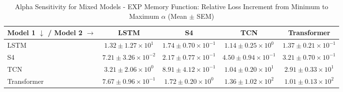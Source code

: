 
\begin{table}[h]
\centering
\caption{Alpha Sensitivity for Mixed Models - EXP Memory Function: Relative Loss Increment from Minimum to Maximum $\alpha$ (Mean $\pm$ SEM)}
\label{tab:mixed_alpha_sensitivity_exp}
\begin{tabular}{lcccc}
\hline
Model 1 $\downarrow$ / Model 2 $\rightarrow$ & LSTM & S4 & TCN & Transformer \\
\hline
LSTM & $1.32 \pm 1.27 \times 10^{1}$ & $1.74 \pm 0.70 \times 10^{-1}$ & $1.14 \pm 0.25 \times 10^{0}$ & $1.37 \pm 0.21 \times 10^{-1}$ \\
S4 & $7.21 \pm 3.26 \times 10^{-2}$ & $2.17 \pm 0.77 \times 10^{-1}$ & $4.50 \pm 0.94 \times 10^{-1}$ & $3.21 \pm 0.70 \times 10^{-1}$ \\
TCN & $3.21 \pm 2.06 \times 10^{0}$ & $8.91 \pm 4.12 \times 10^{-1}$ & $1.04 \pm 0.20 \times 10^{1}$ & $2.91 \pm 0.33 \times 10^{1}$ \\
Transformer & $7.67 \pm 0.96 \times 10^{-1}$ & $1.72 \pm 0.20 \times 10^{0}$ & $1.36 \pm 1.02 \times 10^{2}$ & $1.01 \pm 0.13 \times 10^{2}$ \\
\hline
\end{tabular}
\end{table}
